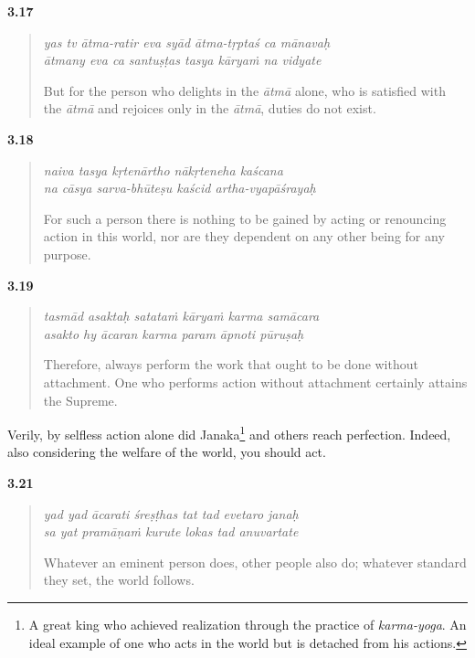 \par\noindent\textbf{3.17}\par
\begin{verse}
\textit{yas tv ātma-ratir eva syād ātma-tṛptaś ca mānavaḥ} \\
\textit{ātmany eva ca santuṣṭas tasya kāryaṁ na vidyate}

\noindent But for the person who delights in the \textit{ātmā} alone, who is satisfied with the \textit{ātmā} and rejoices only in the \textit{ātmā}, duties do not exist.
\end{verse}
\par



\par\noindent\textbf{3.18}\par
\begin{verse}
\textit{naiva tasya kṛtenārtho nākṛteneha kaścana} \\
\textit{na cāsya sarva-bhūteṣu kaścid artha-vyapāśrayaḥ}

\noindent For such a person there is nothing to be gained by acting or renouncing action in this world, nor are they dependent on any other being for any purpose.
\end{verse}
\par



\par\noindent\textbf{3.19}\par
\begin{verse}
\textit{tasmād asaktaḥ satataṁ kāryaṁ karma samācara} \\
\textit{asakto hy ācaran karma param āpnoti pūruṣaḥ}

\noindent Therefore, always perform the work that ought to be done without attachment. One who performs action without attachment certainly attains the Supreme.
\end{verse}
\par


{Verily, by selfless action alone did Janaka\footnote{A great king who achieved realization through the practice of \textit{karma-yoga}. An ideal example of one who acts in the world but is detached from his actions.} and others reach perfection. Indeed, also considering the welfare of the world, you should act.}


\par\noindent\textbf{3.21}\par
\begin{verse}
\textit{yad yad ācarati śreṣṭhas tat tad evetaro janaḥ} \\
\textit{sa yat pramāṇaṁ kurute lokas tad anuvartate}

\noindent Whatever an eminent person does, other people also do; whatever standard they set, the world follows.
\end{verse}
\par



